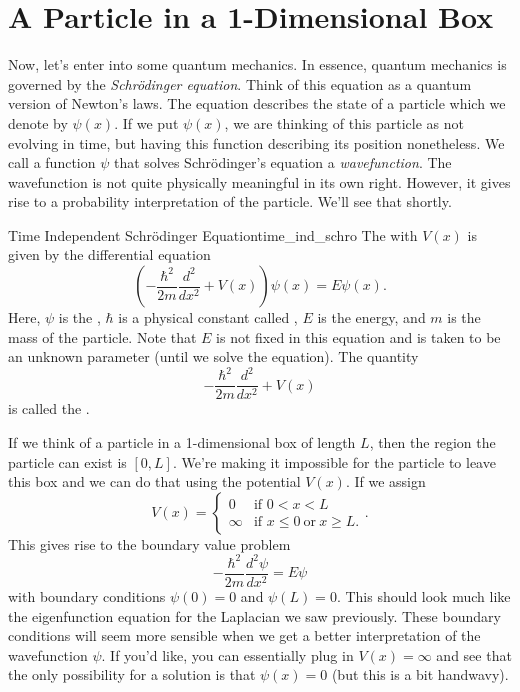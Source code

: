 \section{A Particle in a 1-Dimensional Box}

Now, let's enter into some quantum mechanics.  In essence, quantum mechanics is governed by the \emph{Schr\"odinger equation}.  Think of this equation as a quantum version of Newton's laws.  The equation describes the state of a particle which we denote by $\psi(x)$.  If we put $\psi(x)$, we are thinking of this particle as not evolving in time, but having this function describing its position nonetheless.  We call a function $\psi$ that solves Schr\"odinger's equation a \emph{wavefunction}.  The wavefunction is not quite physically meaningful in its own right.  However, it gives rise to a probability interpretation of the particle. We'll see that shortly.

\begin{df}{Time Independent Schr\"odinger Equation}{time_ind_schro}
The  with  $V(x)$ is given by the differential equation
\[
\left(-\frac{\hbar^2}{2m}\frac{d^2}{dx^2}+V(x)\right)\psi(x)=E\psi(x).
\]
Here, $\psi$ is the , $\hbar$ is a physical constant called , $E$ is the energy, and $m$ is the mass of the particle. Note that $E$ is not fixed in this equation and is taken to be an unknown parameter (until we solve the equation). The quantity
\[
-\frac{\hbar^2}{2m}\frac{d^2}{dx^2}+V(x)
\]
is called the .
\end{df}

If we think of a particle in a 1-dimensional box of length $L$, then the region the particle can exist is $[0,L]$.  We're making it impossible for the particle to leave this box and we can do that using the potential $V(x)$. If we assign
\[
V(x)=\begin{cases} 0 & \textrm{if } 0<x<L\\
\infty & \textrm{if } x\leq 0 ~\textrm{or}~ x\geq L. \end{cases}.
\]
This gives rise to the boundary value problem
\[
-\frac{\hbar^2}{2m}\frac{d^2\psi}{dx^2}=E\psi
\]
with boundary conditions $\psi(0)=0$ and $\psi(L)=0$. This should look much like the eigenfunction equation for the Laplacian we saw previously. These boundary conditions will seem more sensible when we get a better interpretation of the wavefunction $\psi$. If you'd like, you can essentially plug in $V(x)=\infty$ and see that the only possibility for a solution is that $\psi(x)=0$ (but this is a bit handwavy). 

